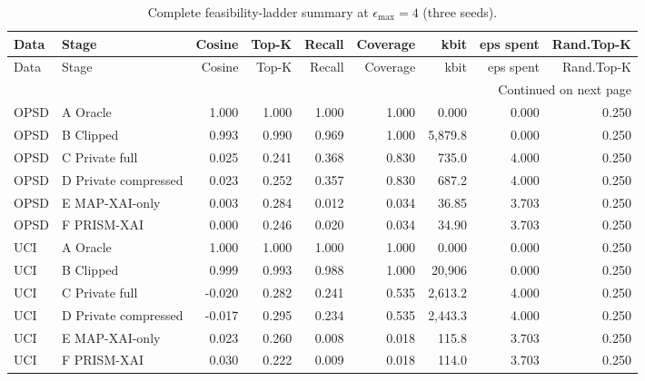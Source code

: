 
\setlength{\tabcolsep}{3pt}
\renewcommand{\arraystretch}{1.08}
\begin{longtable}{llrrrrrrr}
\caption{Complete feasibility-ladder summary at $\epsilon_{\max}=4$ (three seeds).}\label{tab:ladderfull}\\
\toprule
Data & Stage & Cosine & Top-K & Recall & Coverage & kbit & eps spent & Rand.Top-K \\
\midrule
\endfirsthead
\toprule
Data & Stage & Cosine & Top-K & Recall & Coverage & kbit & eps spent & Rand.Top-K \\
\midrule
\endhead
\midrule
\multicolumn{9}{r}{Continued on next page} \\
\endfoot
\bottomrule
\endlastfoot
OPSD & A Oracle & 1.000 & 1.000 & 1.000 & 1.000 & 0.000 & 0.000 & 0.250 \\
OPSD & B Clipped & 0.993 & 0.990 & 0.969 & 1.000 & 5,879.8 & 0.000 & 0.250 \\
OPSD & C Private full & 0.025 & 0.241 & 0.368 & 0.830 & 735.0 & 4.000 & 0.250 \\
OPSD & D Private compressed & 0.023 & 0.252 & 0.357 & 0.830 & 687.2 & 4.000 & 0.250 \\
OPSD & E MAP-XAI-only & 0.003 & 0.284 & 0.012 & 0.034 & 36.85 & 3.703 & 0.250 \\
OPSD & F PRISM-XAI & 0.000 & 0.246 & 0.020 & 0.034 & 34.90 & 3.703 & 0.250 \\
UCI & A Oracle & 1.000 & 1.000 & 1.000 & 1.000 & 0.000 & 0.000 & 0.250 \\
UCI & B Clipped & 0.999 & 0.993 & 0.988 & 1.000 & 20,906 & 0.000 & 0.250 \\
UCI & C Private full & -0.020 & 0.282 & 0.241 & 0.535 & 2,613.2 & 4.000 & 0.250 \\
UCI & D Private compressed & -0.017 & 0.295 & 0.234 & 0.535 & 2,443.3 & 4.000 & 0.250 \\
UCI & E MAP-XAI-only & 0.023 & 0.260 & 0.008 & 0.018 & 115.8 & 3.703 & 0.250 \\
UCI & F PRISM-XAI & 0.030 & 0.222 & 0.009 & 0.018 & 114.0 & 3.703 & 0.250 \\
\end{longtable}